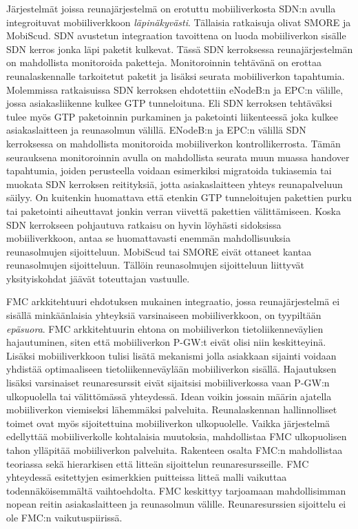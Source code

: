 Järjestelmät joissa reunajärjestelmä on erotuttu mobiiliverkosta SDN:n avulla integroituvat mobiiliverkkoon \textit{läpinäkyvästi}. 
Tällaisia ratkaisuja olivat SMORE ja MobiScud.
SDN avustetun integraation tavoittena on luoda mobiiliverkon sisälle SDN kerros jonka läpi paketit kulkevat.
Tässä SDN kerroksessa reunajärjestelmän on mahdollista monitoroida paketteja. Monitoroinnin tehtävänä on erottaa reunalaskennalle tarkoitetut paketit ja lisäksi seurata mobiiliverkon tapahtumia. 
Molemmissa ratkaisuissa SDN kerroksen ehdotettiin eNodeB:n ja EPC:n välille, jossa asiakasliikenne kulkee GTP tunneloituna.
Eli SDN kerroksen tehtäväksi tulee myös GTP paketoinnin purkaminen ja paketointi liikenteessä joka kulkee asiakaslaitteen ja reunasolmun välillä. 
ENodeB:n ja EPC:n välillä SDN kerroksessa on mahdollista monitoroida mobiiliverkon kontrollikerrosta. Tämän seurauksena  monitoroinnin avulla on mahdollista seurata muun muassa handover tapahtumia, joiden perusteella voidaan esimerkiksi migratoida tukiasemia tai muokata SDN kerroksen reitityksiä, jotta asiakaslaitteen yhteys reunapalveluun säilyy. 
On kuitenkin huomattava että etenkin GTP tunneloitujen pakettien purku tai paketointi aiheuttavat jonkin verran viivettä pakettien välittämiseen.
Koska SDN kerrokseen pohjautuva ratkaisu on hyvin löyhästi sidoksissa mobiiliverkkoon, antaa se huomattavasti enemmän mahdollisuuksia reunasolmujen sijoitteluun. 
MobiScud tai SMORE eivät ottaneet kantaa reunasolmujen sijoitteluun. Tällöin reunasolmujen sijoitteluun liittyvät yksityiskohdat jäävät toteuttajan vastuulle.

FMC arkkitehtuuri ehdotuksen mukainen integraatio, jossa reunajärjestelmä ei sisällä minkäänlaisia yhteyksiä varsinaiseen mobiiliverkkoon, on tyypiltään \textit{epäsuora}.
FMC arkkitehtuurin ehtona on mobiiliverkon tietoliikenneväylien hajautuminen, siten että mobiiliverkon P-GW:t eivät olisi niin keskitteyinä. 
Lisäksi mobiiliverkkoon tulisi lisätä mekanismi jolla asiakkaan sijainti voidaan yhdistää optimaaliseen tietoliikenneväylään mobiiliverkon sisällä.
Hajautuksen lisäksi varsinaiset reunaresurssit eivät sijaitsisi mobiiliverkossa vaan P-GW:n ulkopuolella tai välittömässä yhteydessä.
Idean voikin jossain määrin ajatella mobiiliverkon viemiseksi lähemmäksi palveluita.
Reunalaskennan hallinnolliset toimet ovat myös sijoitettuina mobiiliverkon ulkopuolelle.
Vaikka järjestelmä edellyttää mobiiliverkolle kohtalaisia muutoksia, mahdollistaa FMC ulkopuolisen tahon ylläpitää mobiiliverkon palveluita.
Rakenteen osalta FMC:n mahdollistaa teoriassa sekä hierarkisen että litteän sijoittelun reunaresursseille.
FMC yhteydessä esitettyjen esimerkkien puitteissa litteä malli vaikuttaa todennäköisemmältä vaihtoehdolta. 
FMC keskittyy tarjoamaan mahdollisimman nopean reitin asiakaslaitteen ja reunasolmun välille.
Reunaresurssien sijoittelu ei ole FMC:n vaikutuspiirissä.


